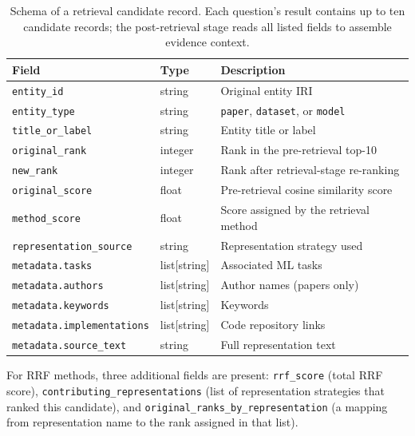 \begin{table}[htbp]
  \centering
  \caption{Schema of a retrieval candidate record. Each question's result
    contains up to ten candidate records; the post-retrieval stage reads all
    listed fields to assemble evidence context.}
  \label{tab:candidate_schema}
  \begin{tabular}{lll}
    \toprule
    Field & Type & Description \\
    \midrule
    \texttt{entity\_id}           & string       & Original entity IRI \\
    \texttt{entity\_type}         & string       & \texttt{paper}, \texttt{dataset}, or \texttt{model} \\
    \texttt{title\_or\_label}     & string       & Entity title or label \\
    \texttt{original\_rank}       & integer      & Rank in the pre-retrieval top-10 \\
    \texttt{new\_rank}            & integer      & Rank after retrieval-stage re-ranking \\
    \texttt{original\_score}      & float        & Pre-retrieval cosine similarity score \\
    \texttt{method\_score}        & float        & Score assigned by the retrieval method \\
    \texttt{representation\_source} & string     & Representation strategy used \\
    \texttt{metadata.tasks}       & list[string] & Associated ML tasks \\
    \texttt{metadata.authors}     & list[string] & Author names (papers only) \\
    \texttt{metadata.keywords}    & list[string] & Keywords \\
    \texttt{metadata.implementations} & list[string] & Code repository links \\
    \texttt{metadata.source\_text}& string       & Full representation text \\
    \bottomrule
  \end{tabular}
\end{table}

For RRF methods, three additional fields are present:
\texttt{rrf\_score} (total RRF score),
\texttt{contributing\_representations} (list of representation strategies
that ranked this candidate), and
\texttt{original\_ranks\_by\_representation} (a mapping from representation
name to the rank assigned in that list).

